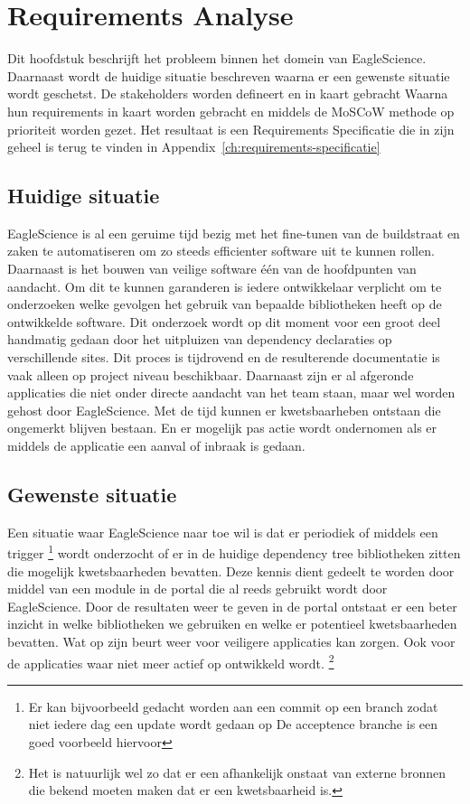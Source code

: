 
\chapter{Requirements Analyse}\label{ch:requirements-analyse}
Dit hoofdstuk beschrijft het probleem binnen het domein van EagleScience. Daarnaast wordt de huidige situatie beschreven waarna er een gewenste situatie wordt geschetst. De stakeholders worden defineert en in kaart gebracht Waarna hun requirements in kaart worden gebracht en middels de MoSCoW methode op prioriteit worden gezet. Het resultaat is een Requirements Specificatie die in zijn geheel is terug te vinden in Appendix~\ref{ch:requirements-specificatie}

\section{Huidige situatie}\label{sec:huidige-situatie}
EagleScience is al een geruime tijd bezig met het fine-tunen van de buildstraat en zaken te automatiseren om zo steeds efficienter software uit te kunnen rollen. Daarnaast is het bouwen van veilige software één van de hoofdpunten van aandacht. Om dit te kunnen garanderen is iedere ontwikkelaar verplicht om te onderzoeken welke gevolgen het gebruik van bepaalde bibliotheken heeft op de ontwikkelde software. Dit onderzoek wordt op dit moment voor een groot deel handmatig gedaan door het uitpluizen van dependency declaraties op verschillende sites. Dit proces is tijdrovend en de resulterende documentatie is vaak alleen op project niveau beschikbaar. Daarnaast zijn er al afgeronde applicaties die niet onder directe aandacht van het team staan, maar wel worden gehost door EagleScience. Met de tijd kunnen er kwetsbaarheben ontstaan die ongemerkt blijven bestaan. En er mogelijk pas actie wordt ondernomen als er middels de applicatie een aanval of inbraak is gedaan.

\section{Gewenste situatie}\label{sec:gewenste-situatie}
Een situatie waar EagleScience naar toe wil is dat er periodiek of middels een trigger \footnote{Er kan bijvoorbeeld gedacht worden aan een commit op een branch zodat niet iedere dag een update wordt gedaan op De acceptence branche is een goed voorbeeld hiervoor} wordt onderzocht of er in de huidige dependency tree bibliotheken zitten die mogelijk kwetsbaarheden bevatten. Deze kennis dient gedeelt te worden door middel van een module in de portal die al reeds gebruikt wordt door EagleScience. Door de resultaten weer te geven in de portal ontstaat er een beter inzicht in welke bibliotheken we gebruiken en welke er potentieel kwetsbaarheden bevatten. Wat op zijn beurt weer voor veiligere applicaties kan zorgen. Ook voor de applicaties waar niet meer actief op ontwikkeld wordt. \footnote{Het is natuurlijk wel zo dat er een afhankelijk onstaat van externe bronnen die bekend moeten maken dat er een kwetsbaarheid is.}



